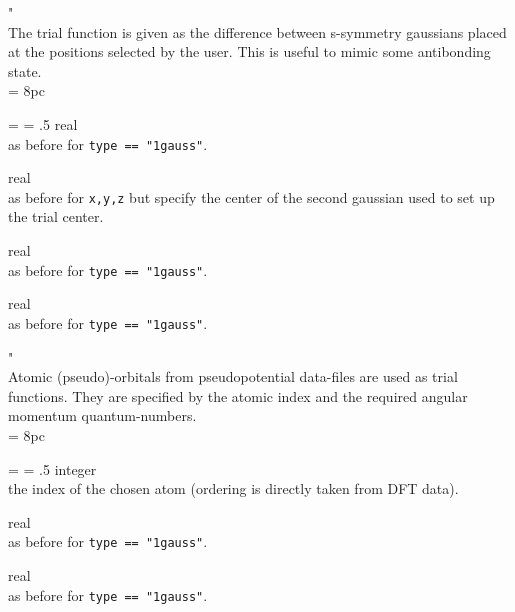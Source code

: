 \bigskip

"\\
\noindent The trial function is given as the difference between s-symmetry gaussians placed
at the positions selected by the user. This is useful to mimic some antibonding state.\\

\newdimen\descindent \descindent = 8pc
{\noindent \leftskip = \descindent \parskip = .5\baselineskip
{}%
{\sc real} \\ as before for {\tt type == "1gauss"}. \par

\noindent{}%
{\sc real} \\ as before for {\tt x,y,z} but specify the center of the second gaussian
            used to set up the trial center.  \par

\noindent{}%
{\sc real} \\  as before for {\tt type == "1gauss"}. \par

\noindent{}%
{\sc real} \\  as before for {\tt type == "1gauss"}. \par
}
\bigskip

"\\
\noindent Atomic (pseudo)-orbitals from pseudopotential data-files are used as trial functions.
They are specified by the atomic index and the required angular momentum quantum-numbers.\\

\newdimen\descindent \descindent = 8pc
{\noindent \leftskip = \descindent \parskip = .5\baselineskip
{}%
{\sc integer} \\ the index of the chosen atom (ordering is directly taken from DFT data). \par

\noindent{}%
{\sc real} \\ as before for {\tt type == "1gauss"}.\par

\noindent{}%
{\sc real} \\ as before for {\tt type == "1gauss"}.\par
}


